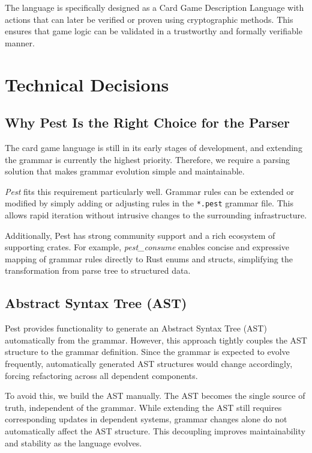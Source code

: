 \documentclass[a4paper,11pt]{article}
\begin{document}
The language is specifically designed as a Card Game Description Language with actions that can later be verified or proven using cryptographic methods. This ensures that game logic can be validated in a trustworthy and formally verifiable manner.


\section{Technical Decisions}

\subsection{Why Pest Is the Right Choice for the Parser}

The card game language is still in its early stages of development, and extending the grammar is currently the highest priority. Therefore, we require a parsing solution that makes grammar evolution simple and maintainable.

\textit{Pest} fits this requirement particularly well. Grammar rules can be extended or modified by simply adding or adjusting rules in the \texttt{*.pest} grammar file. This allows rapid iteration without intrusive changes to the surrounding infrastructure.

Additionally, Pest has strong community support and a rich ecosystem of supporting crates. For example, \textit{pest\_consume} enables concise and expressive mapping of grammar rules directly to Rust enums and structs, simplifying the transformation from parse tree to structured data.

\subsection{Abstract Syntax Tree (AST)}

Pest provides functionality to generate an Abstract Syntax Tree (AST) automatically from the grammar. However, this approach tightly couples the AST structure to the grammar definition. Since the grammar is expected to evolve frequently, automatically generated AST structures would change accordingly, forcing refactoring across all dependent components.

To avoid this, we build the AST manually. The AST becomes the single source of truth, independent of the grammar. While extending the AST still requires corresponding updates in dependent systems, grammar changes alone do not automatically affect the AST structure. This decoupling improves maintainability and stability as the language evolves.
\end{document}
